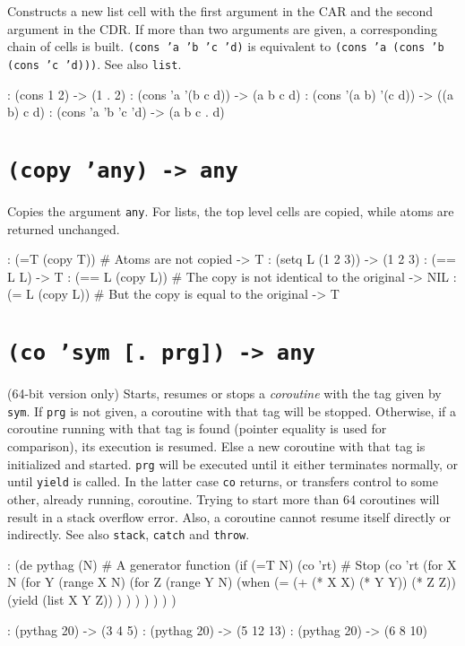Constructs a new list cell with the first argument in the CAR and the
second argument in the CDR. If more than two arguments are given, a
corresponding chain of cells is built. \texttt{(cons 'a 'b 'c 'd)} is
equivalent to \texttt{(cons 'a (cons 'b (cons 'c 'd)))}. See also \texttt{list}.


\begin{wideverbatim}
: (cons 1 2)
-> (1 . 2)
: (cons 'a '(b c d))
-> (a b c d)
: (cons '(a b) '(c d))
-> ((a b) c d)
: (cons 'a 'b 'c 'd)
-> (a b c . d)
\end{wideverbatim}

 
\section*{\texttt{(copy 'any) -> any}}
\label{sec:funct-rec-C-(copy-'any)-->-any}


Copies the argument \texttt{any}. For lists, the top level cells are copied,
while atoms are returned unchanged.


\begin{wideverbatim}
: (=T (copy T))               # Atoms are not copied
-> T
: (setq L (1 2 3))
-> (1 2 3)
: (== L L)
-> T
: (== L (copy L))             # The copy is not identical to the original
-> NIL
: (= L (copy L))              # But the copy is equal to the original
-> T
\end{wideverbatim}

 
\section*{\texttt{(co 'sym [. prg]) -> any}}
\label{sec:funct-rec-C-(co-'sym-[.-prg])-->-any}


(64-bit version only) Starts, resumes or stops a
\emph{coroutine} with the tag given by \texttt{sym}. If \texttt{prg}
is not given, a coroutine with that tag will be stopped. Otherwise, if a
coroutine running with that tag is found (pointer equality is used for
comparison), its execution is resumed. Else a new coroutine with that
tag is initialized and started. \texttt{prg} will be executed until it either
terminates normally, or until \texttt{yield} is called. In the latter case \texttt{co}
returns, or transfers control to some other, already running, coroutine.
Trying to start more than 64 coroutines will result in a stack overflow
error. Also, a coroutine cannot resume itself directly or indirectly.
See also \texttt{stack}, \texttt{catch} and \texttt{throw}.


\begin{wideverbatim}
: (de pythag (N)   # A generator function
   (if (=T N)
      (co 'rt)  # Stop
      (co 'rt
         (for X N
            (for Y (range X N)
               (for Z (range Y N)
                  (when (= (+ (* X X) (* Y Y)) (* Z Z))
                     (yield (list X Y Z)) ) ) ) ) ) ) )

: (pythag 20)
-> (3 4 5)
: (pythag 20)
-> (5 12 13)
: (pythag 20)
-> (6 8 10)
\end{wideverbatim}

